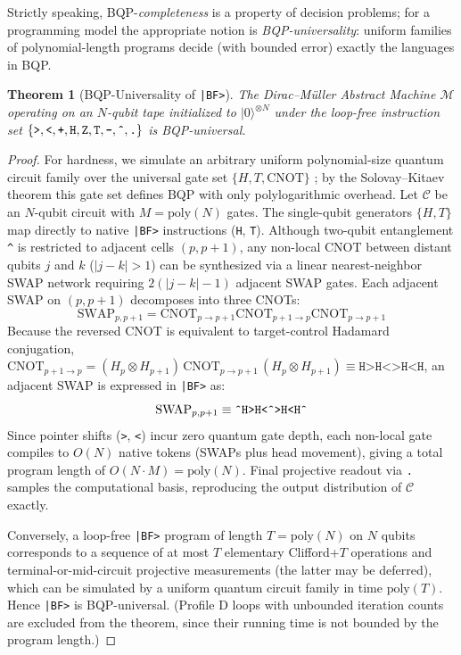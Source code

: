 \documentclass[11pt,a4paper,twocolumn]{article}
\newcommand{\ket}[1]{| #1 \rangle}
\newtheorem{theorem}{Theorem}
\begin{document}
Strictly speaking, BQP-\emph{completeness} is a property of decision problems; for a programming model the appropriate notion is \emph{BQP-universality}: uniform families of polynomial-length programs decide (with bounded error) exactly the languages in BQP.

\begin{theorem}[BQP-Universality of \texttt{|BF>}]
The Dirac--M\"uller Abstract Machine $\mathcal{M}$ operating on an $N$-qubit tape initialized to $\ket{0}^{\otimes N}$ under the loop-free instruction set $\{\texttt{>}, \texttt{<}, \texttt{+}, \texttt{H}, \texttt{Z}, \texttt{T}, \texttt{-}, \texttt{\^{}}, \texttt{.}\}$ is BQP-universal.
\end{theorem}

\begin{proof}
For hardness, we simulate an arbitrary uniform polynomial-size quantum circuit family over the universal gate set $\{H, T, \text{CNOT}\}$ \cite{boykin1999optimal}; by the Solovay--Kitaev theorem \cite{nielsen2010quantum} this gate set defines BQP with only polylogarithmic overhead. Let $\mathcal{C}$ be an $N$-qubit circuit with $M = \text{poly}(N)$ gates. The single-qubit generators $\{H, T\}$ map directly to native \texttt{|BF>} instructions (\texttt{H}, \texttt{T}). Although two-qubit entanglement \texttt{\^{}} is restricted to adjacent cells $(p, p+1)$, any non-local CNOT between distant qubits $j$ and $k$ ($|j - k| > 1$) can be synthesized via a linear nearest-neighbor SWAP network \cite{fowler2004lnn,saeedi2011lnn} requiring $2(|j - k| - 1)$ adjacent SWAP gates. Each adjacent SWAP on $(p, p+1)$ decomposes into three CNOTs:
\begin{equation}
    \text{SWAP}_{p, p+1} = \text{CNOT}_{p \to p+1}\text{CNOT}_{p+1 \to p}\text{CNOT}_{p \to p+1}
\end{equation}
Because the reversed CNOT is equivalent to target-control Hadamard conjugation, $\text{CNOT}_{p+1 \to p} = (H_p \otimes H_{p+1}) \, \text{CNOT}_{p \to p+1} \, (H_p \otimes H_{p+1}) \equiv \texttt{H>H<\^{}>H<H}$, an adjacent SWAP is expressed in \texttt{|BF>} as:
\begin{equation}
    \text{SWAP}_{p, p+1} \equiv \texttt{\^{}H>H<\^{}>H<H\^{}}
\end{equation}
Since pointer shifts (\texttt{>}, \texttt{<}) incur zero quantum gate depth, each non-local gate compiles to $O(N)$ native tokens (SWAPs plus head movement), giving a total program length of $O(N \cdot M) = \text{poly}(N)$. Final projective readout via \texttt{.} samples the computational basis, reproducing the output distribution of $\mathcal{C}$ exactly.

Conversely, a loop-free \texttt{|BF>} program of length $T = \text{poly}(N)$ on $N$ qubits corresponds to a sequence of at most $T$ elementary Clifford+$T$ operations and terminal-or-mid-circuit projective measurements (the latter may be deferred), which can be simulated by a uniform quantum circuit family \cite{bernstein1997quantum} in time $\text{poly}(T)$. Hence \texttt{|BF>} is BQP-universal. (Profile D loops with unbounded iteration counts are excluded from the theorem, since their running time is not bounded by the program length.)
\end{proof}
\end{document}
